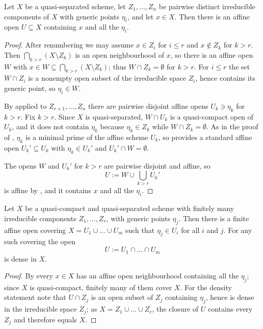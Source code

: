 \begin{lemma}
\label{lem:chow-affine-through-generic-points}
\leanok
Let $X$ be a quasi-separated scheme, let $Z_1,\dots,Z_n$ be pairwise distinct
irreducible components of $X$ with generic points $\eta_i$, and let $x\in X$.
Then there is an affine open $U\subseteq X$ containing $x$ and all the
$\eta_i$.
\end{lemma}
\begin{proof}
\leanok
After renumbering we may assume $x\in Z_i$ for $i\leq r$ and $x\notin Z_k$ for
$k>r$.  Then $\bigcap_{k>r}(X\setminus Z_k)$ is an open neighbourhood of $x$,
so there is an affine open $W$ with
$x\in W\subseteq\bigcap_{k>r}(X\setminus Z_k)$; thus $W\cap Z_k=\emptyset$ for
$k>r$.  For $i\leq r$ the set $W\cap Z_i$ is a nonempty open subset of the
irreducible space $Z_i$, hence contains its generic point, so $\eta_i\in W$.

By  applied to $Z_{r+1},\dots,Z_n$ there are
pairwise disjoint affine opens $U_k\ni\eta_k$ for $k>r$.  Fix $k>r$.  Since $X$
is quasi-separated, $W\cap U_k$ is a quasi-compact open of $U_k$, and it does
not contain $\eta_k$ because $\eta_k\in Z_k$ while $W\cap Z_k=\emptyset$.  As
in the proof of , $\eta_k$ is a minimal prime
of the affine scheme $U_k$, so  provides a standard affine
open $U_k'\subseteq U_k$ with $\eta_k\in U_k'$ and $U_k'\cap W=\emptyset$.

The opens $W$ and $U_k'$ for $k>r$ are pairwise disjoint and affine, so
\[
  U:=W\cup\bigcup_{k>r}U_k'
\]
is affine by , and it contains $x$ and all the $\eta_i$.
\end{proof}

\begin{lemma}\label{lem:chow-affine-cover}
\leanok
Let $X$ be a quasi-compact and quasi-separated scheme with finitely many
irreducible components $Z_1,\dots,Z_r$, with generic points $\eta_j$.  Then
there is a finite affine open covering $X=U_1\cup\dots\cup U_m$ such that
$\eta_j\in U_i$ for all $i$ and $j$.  For any such covering the open
\[
  U:=U_1\cap\dots\cap U_m
\]
is dense in $X$.
\end{lemma}
\begin{proof}
\leanok
By  every $x\in X$ has an affine
open neighbourhood containing all the $\eta_j$; since $X$ is quasi-compact,
finitely many of them cover $X$.  For the density statement note that
$U\cap Z_j$ is an open subset of $Z_j$ containing $\eta_j$, hence is dense in
the irreducible space $Z_j$; as $X=Z_1\cup\dots\cup Z_r$, the closure of $U$
contains every $Z_j$ and therefore equals $X$.
\end{proof}

